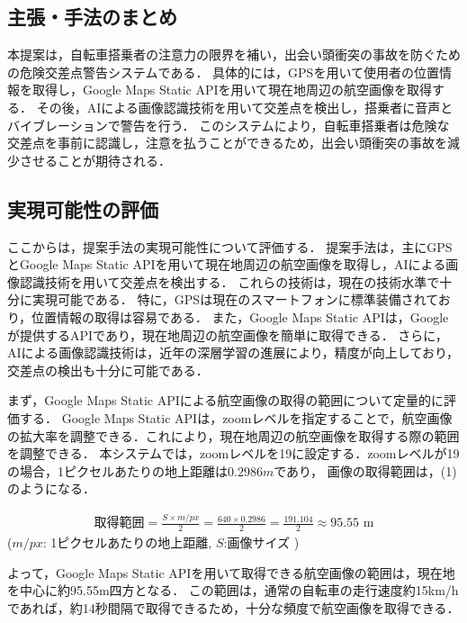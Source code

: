 \documentclass[uplatex,dvipdfmx]{jsarticle}
\begin{document}
\subsection{主張・手法のまとめ}
\indent
本提案は，自転車搭乗者の注意力の限界を補い，出会い頭衝突の事故を防ぐための危険交差点警告システムである．
具体的には，GPSを用いて使用者の位置情報を取得し，Google Maps Static APIを用いて現在地周辺の航空画像を取得する．
その後，AIによる画像認識技術を用いて交差点を検出し，搭乗者に音声とバイブレーションで警告を行う．
このシステムにより，自転車搭乗者は危険な交差点を事前に認識し，注意を払うことができるため，出会い頭衝突の事故を減少させることが期待される．
\par

\subsection{実現可能性の評価}
\indent
ここからは，提案手法の実現可能性について評価する．
提案手法は，主にGPSとGoogle Maps Static APIを用いて現在地周辺の航空画像を取得し，AIによる画像認識技術を用いて交差点を検出する．
これらの技術は，現在の技術水準で十分に実現可能である．
特に，GPSは現在のスマートフォンに標準装備されており，位置情報の取得は容易である．
また，Google Maps Static APIは，Googleが提供するAPIであり，現在地周辺の航空画像を簡単に取得できる．
さらに，AIによる画像認識技術は，近年の深層学習の進展により，精度が向上しており，交差点の検出も十分に可能である．
\par
まず，Google Maps Static APIによる航空画像の取得の範囲について定量的に評価する．
Google Maps Static APIは，zoomレベルを指定することで，航空画像の拡大率を調整できる．これにより，現在地周辺の航空画像を取得する際の範囲を調整できる．
本システムでは，zoomレベルを19に設定する．zoomレベルが19の場合，1ピクセルあたりの地上距離は$0.2986m$であり，
画像の取得範囲は，(1)のようになる\cite{ref:zoomrevel}．

\begin{align}
\mathrm{取得範囲} = \frac{S\times m/px}{2} = \frac{640 \times 0.2986}{2} = \frac{191.104}{2} ≈ 95.55 \text{ m}
\end{align}
($m/px$: 1ピクセルあたりの地上距離, $S$:画像サイズ )
\vspace{0.75cm}

よって，Google Maps Static APIを用いて取得できる航空画像の範囲は，現在地を中心に約95.55m四方となる．
この範囲は，通常の自転車の走行速度約15km/hであれば，約14秒間隔で取得できるため，十分な頻度で航空画像を取得できる．
\par
\end{document}
